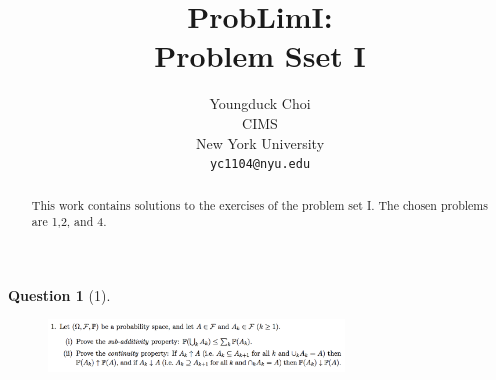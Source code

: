 \documentclass{article} %
\title{ProbLimI: \\
Problem Sset I}
\author{
Youngduck Choi \\
CIMS \\
New York University\\
\texttt{yc1104@nyu.edu} \\
}
\theoremstyle{quest}
\newtheorem*{question}{Question}
\begin{document}
\maketitle

\begin{abstract}
This work contains solutions to the exercises of the problem set I. The
chosen problems are 1,2, and 4.
\end{abstract}

\bigskip

\begin{question}[1]
\hfill
\begin{figure}[h!]
  \centering
    \includegraphics[width=0.7\textwidth]{problim-e1-p1.png}
\end{figure}
\end{question}
\end{document}
